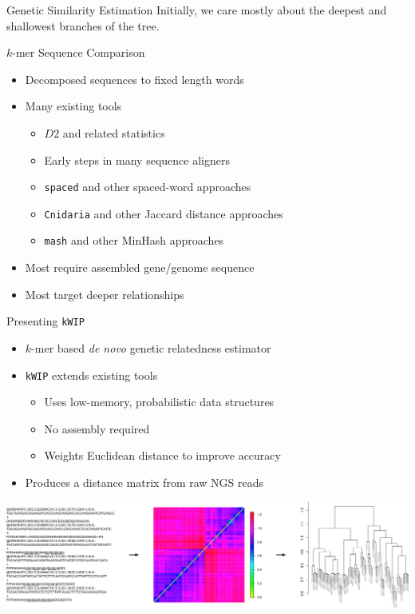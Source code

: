 \documentclass[t]{beamer}
\begin{document}
\begin{frame}[c]{Genetic Similarity Estimation}
  \centering Initially, we care mostly about the deepest and shallowest
  branches of the tree.
\end{frame}

\begin{frame}{$k$-mer Sequence Comparison}
  \begin{itemize}
    \item Decomposed sequences to fixed length words
    \item Many existing tools
    \begin{itemize}
      \item $D2$ and related statistics
      \item Early steps in many sequence aligners
      \item \texttt{spaced} and other spaced-word approaches
        \autocite{morgenstern_estimating_2015,leimeister_fast_2014}
      \item \texttt{Cnidaria} and other Jaccard distance approaches
        \autocite{aflitos_cnidaria:_2015}
      \item \texttt{mash} and other MinHash approaches
        \autocite{ondov_fast_2015}
    \end{itemize}
    \item Most require assembled gene/genome sequence
    \item Most target deeper relationships
  \end{itemize}
\end{frame}

\begin{frame}{Presenting \texttt{kWIP}}
  \begin{itemize}
    \item $k$-mer based \textit{de novo} genetic relatedness estimator
    \item \texttt{kWIP} extends existing tools
      \begin{itemize}
        \item Uses low-memory, probabilistic data structures
        \item No assembly required
        \item Weights Euclidean distance to improve accuracy
      \end{itemize}
    \item Produces a distance matrix from raw NGS reads
  \end{itemize}
  \begin{center}
    \includegraphics[width=\textwidth]{img/kwip-overview.png}
  \end{center}
\end{frame}
\end{document}
